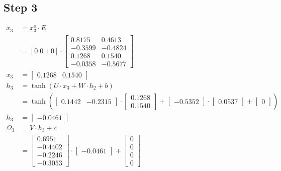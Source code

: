 \documentclass{article}
\begin{document}
\subsection{Step 3}
\begin{align*}
    x_3 & = x^o_3 \cdot E \\
    & =  [0 \; 0\; 1\; 0] \cdot \begin{bmatrix}
  0.8175 & 0.4613 \\
 -0.3599 & -0.4824 \\
  0.1268 & 0.1540 \\
 -0.0358 & -0.5677
\end{bmatrix} \\
    x_3 & = \begin{bmatrix}
  0.1268 & 0.1540
\end{bmatrix} \\
    h_3 & = \tanh(U \cdot x_3 + W \cdot h_2 + b) \\
    & = \tanh\left(\begin{bmatrix}
  0.1442 & -0.2315
\end{bmatrix} \cdot \begin{bmatrix}
 0.1268 \\ 0.1540
\end{bmatrix} + \begin{bmatrix}
 -0.5352
\end{bmatrix} \cdot \begin{bmatrix} 0.0537 \end{bmatrix} + \begin{bmatrix} 0 \end{bmatrix}\right) \\
    h_3 & = \begin{bmatrix} -0.0461 \end{bmatrix} \\
    \Omega_3 & = V \cdot h_3 + c \\
    & = \begin{bmatrix}
  0.6951 \\
 -0.4402 \\
 -0.2246 \\
 -0.3053
\end{bmatrix} \cdot \begin{bmatrix} -0.0461 \end{bmatrix} + \begin{bmatrix} 0 \\ 0 \\ 0 \\ 0 \end{bmatrix} \\

\end{align*}
\end{document}
